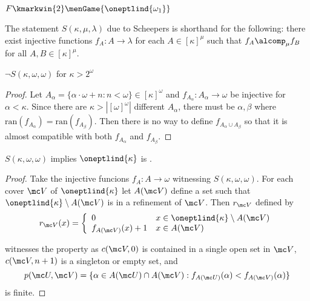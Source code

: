   \begin{cor}
    $F\kmarkwin{2}\menGame{\oneptlind{\omega_1}}$
  \end{cor}

  \begin{defn}
    The statement $S(\kappa,\mu,\lambda)$ due to Scheepers is shorthand for the following: there exist injective functions $f_A:A\to\lambda$ for each $A\in[\kappa]^\mu$ such that $f_A\alcomp_\mu f_B$ for all $A,B\in[\kappa]^\mu$.
  \end{defn}

  \begin{prop}
    $\neg S(\kappa,\omega,\omega)$ for $\kappa>2^\omega$
  \end{prop}

  \begin{proof}
    Let $A_\alpha=\{\alpha\cdot\omega+n:n<\omega\}\in[\kappa]^\omega$ and $f_{A_\alpha}:A_\alpha\to\omega$ be injective for $\alpha<\kappa$. Since there are $\kappa>|[\omega]^\omega|$ different $A_\alpha$, there must be $\alpha,\beta$ where $\text{ran}(f_{A_\alpha})=\text{ran}(f_{A_\beta})$. Then there is no way to define $f_{A_\alpha\cup A_\beta}$ so that it is almost compatible with both $f_{A_\alpha}$ and $f_{A_\beta}$.
  \end{proof}

  \begin{thm}
    $S(\kappa,\omega,\omega)$ implies $\oneptlind{\kappa}$ is \scish.
  \end{thm}

  \begin{proof}
    Take the injective funcions $f_A:A\to\omega$ witnessing $S(\kappa,\omega,\omega)$. For each cover $\mc V$ of $\oneptlind{\kappa}$ let $A(\mc V)$ define a set such that $\oneptlind{\kappa}\setminus A(\mc V)$ is in a refinement of $\mc V$. Then $r_{\mc V}$ defined by
      \[
        r_{\mc V}(x) = \left\{
      \begin{array}{ll}
        0 & x\in\oneptlind{\kappa}\setminus A(\mc V) \\
        f_{A(\mc V)}(x)+1 & x\in A(\mc V)
      \end{array}
      \right.
      \]

    witnesses the property as $c(\mc V,0)$ is contained in a single open set in $\mc V$, $c(\mc V,n+1)$ is a singleton or empty set, and
      \[
        p(\mc U,\mc V) = \{\alpha\in A(\mc U)\cap A(\mc V) : f_{A(\mc U)}(\alpha)<f_{A(\mc V)}(\alpha)\}
      \]
    is finite.
  \end{proof}

